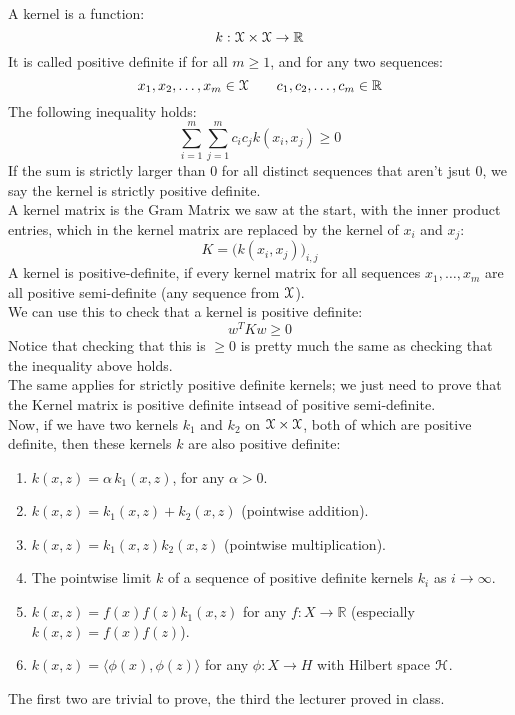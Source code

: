 \documentclass[12pt]{article}
\begin{document}
A kernel is a function:
\[ k: \mathcal{X} \times \mathcal{X} \to \mathbb{R} \]
It is called positive definite if for all
$m \geq 1$, and for any two sequences:
\[ x_1, x_2,\dots, x_m \in \mathcal{X} 
\qquad c_1, c_2, \dots, c_m \in \mathbb{R} \]
The following inequality holds:
\[ \sum_{i=1}^m \sum_{j=1}^m c_i c_j k(x_i, x_j) \geq 0 \]
If the sum is strictly larger than $0$
for all distinct sequences that aren't jsut $0$,
we say the kernel is strictly positive definite. \\

A kernel matrix is the Gram Matrix we saw at the start,
with the inner product entries, which in the kernel
matrix are replaced by the kernel of $x_i$
and $x_j$:
\[ K = \big( k(x_i, x_j) \big)_{i,j} \]
A kernel is positive-definite, if every
kernel matrix for all sequences $x_1, \dots, x_m$
are all positive 
semi-definite (any sequence from $\mathcal{X}$). \\
We can use this to check that a kernel is positive
definite:
\[ w^TKw \geq 0 \]
Notice that checking that this is $\geq 0$
is pretty much the same as checking that the
inequality above holds. \\

The same applies for strictly positive definite 
kernels; we just need to prove that the Kernel matrix 
is positive definite intsead of positive
semi-definite. \\

Now, if we have two kernels $k_1$ and $k_2$
on $\mathcal{X} \times \mathcal{X}$, both of which are
positive definite, then these kernels $k$
are also positive definite:
\begin{enumerate}
    \item \( k(x, z) = \alpha \, k_1(x, z) \), 
    for any \(\alpha > 0\).
    \item \( k(x, z) = k_1(x, z) + k_2(x, z) \) 
    (pointwise addition).
    \item \( k(x, z) = k_1(x, z) k_2(x, z) \) 
    (pointwise multiplication).
    \item The pointwise limit \( k \) 
    of a sequence of positive definite kernels 
    \( k_i \) as \( i \to \infty \).
    \item \( k(x, z) = f(x) f(z) k_1(x, z) \) 
    for any \( f : X \to \mathbb{R} \) 
    (especially \( k(x, z) = f(x) f(z) \)).
    \item \( k(x, z) = \langle \phi(x), \phi(z) 
    \rangle \) for any \( \phi : X \to H \) with 
    Hilbert space \( \mathcal{H} \).
\end{enumerate}
The first two are trivial to prove, the third
the lecturer proved in class. \\
\end{document}
